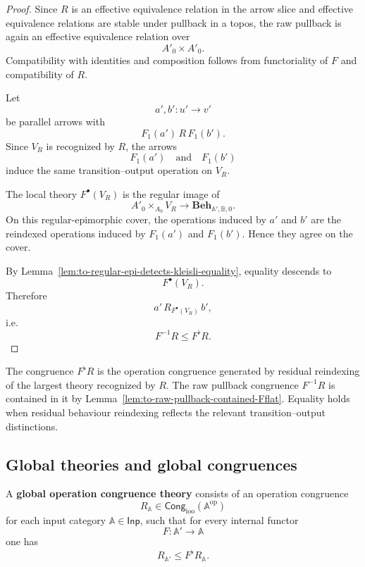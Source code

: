 \begin{proof}
    Since \(R\) is an effective equivalence relation in the arrow slice and
    effective equivalence relations are stable under pullback in a topos, the
    raw pullback is again an effective equivalence relation over
    \[
        A'_0\times A'_0.
    \]
    Compatibility with identities and composition follows from functoriality of
    \(F\) and compatibility of \(R\).

    Let
    \[
        a',b':u'\to v'
    \]
    be parallel arrows with
    \[
        F_1(a')\,R\,F_1(b').
    \]
    Since \(V_R\) is recognized by \(R\), the arrows
    \[
        F_1(a')
        \quad\text{and}\quad
        F_1(b')
    \]
    induce the same transition--output operation on \(V_R\).

    The local theory \(F^\bullet(V_R)\) is the regular image of
    \[
        A'_0\times_{A_0}V_R
        \to
        \mathbf{Beh}_{\mathbb A',\mathbb B,0}.
    \]
    On this regular-epimorphic cover, the operations induced by \(a'\) and
    \(b'\) are the reindexed operations induced by \(F_1(a')\) and
    \(F_1(b')\). Hence they agree on the cover.

    By Lemma~\ref{lem:to-regular-epi-detects-kleisli-equality}, equality
    descends to
    \[
        F^\bullet(V_R).
    \]
    Therefore
    \[
        a'\,R_{F^\bullet(V_R)}\,b',
    \]
    i.e.
    \[
        F^{-1}R\leq F^\flat R.
    \]
\end{proof}

\begin{remark}
\label{rem:to-raw-pullback-versus-operational-pullback}
    The congruence \(F^\flat R\) is the operation congruence generated by
    residual reindexing of the largest theory recognized by \(R\). The raw
    pullback congruence \(F^{-1}R\) is contained in it by
    Lemma~\ref{lem:to-raw-pullback-contained-Fflat}. Equality holds when
    residual behaviour reindexing reflects the relevant transition--output
    distinctions.
\end{remark}

\subsection{Global theories and global congruences}
\label{subsec:to-global-theories-congruences}

\begin{definition}
\label{def:to-global-operation-congruence-theory}
    A \textbf{global operation congruence theory} consists of an operation
    congruence
    \[
        R_{\mathbb A}\in
        \mathsf{Cong}_{\mathrm{ioo}}(\mathbb A^{\mathrm{op}})
    \]
    for each input category \(\mathbb A\in\mathsf{Inp}\), such that for every
    internal functor
    \[
        F:\mathbb A'\to\mathbb A
    \]
    one has
    \[
        R_{\mathbb A'}\leq F^\flat R_{\mathbb A}.
    \]
\end{definition}

